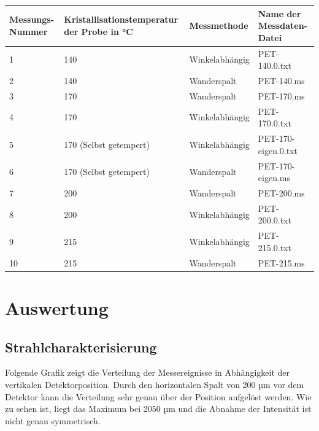 \documentclass[bigchapter,colorback,accentcolor=tud4b,linedtoc,11pt]{tudreport}
\begin{document}
\begin{center}
  \begin{tabular}{|p{2.2cm}|p{4.5cm}|p{3cm}|p{4cm}|}
    \hline
    Messungs-Nummer & Kristallisationstemperatur der Probe in °C & Messmethode    & Name der Messdaten-Datei \\ \hline
    1               & 140                                        & Winkelabhängig & PET-140.0.txt \\ \hline
    2               & 140                                        & Wanderspalt    & PET-140.ms \\ \hline
    3               & 170                                        & Wanderspalt    & PET-170.ms \\ \hline
    4               & 170                                        & Winkelabhängig & PET-170.0.txt \\ \hline
    5               & 170 (Selbst getempert)                     & Winkelabhängig & PET-170-eigen.0.txt \\ \hline
    6               & 170 (Selbst getempert)                     & Wanderspalt    & PET-170-eigen.ms \\ \hline
    7               & 200                                        & Wanderspalt    & PET-200.ms \\ \hline
    8               & 200                                        & Winkelabhängig & PET-200.0.txt \\ \hline
    9               & 215                                        & Winkelabhängig & PET-215.0.txt \\ \hline
    10              & 215                                        & Wanderspalt    & PET-215.ms \\ \hline
	\end{tabular}
\end{center}

\chapter{Auswertung}
\section{Strahlcharakterisierung}

Folgende Grafik zeigt die Verteilung der Messereignisse in Abhängigkeit der vertikalen Detektorposition. Durch den horizontalen Spalt von 200 µm vor dem Detektor kann die Verteilung sehr genau über der Position aufgelöst werden. Wie zu sehen ist, liegt das Maximum bei 2050 µm und die Abnahme der Intensität ist nicht genau symmetrisch.
\end{document}
